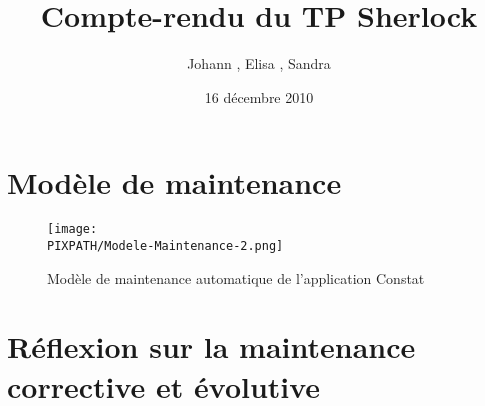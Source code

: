 \documentclass[a4paper]{article}
\title{\vfill \textbf{Compte-rendu du TP Sherlock}}
\author{Johann \bsc{Chazelle}, Elisa \bsc{Abidh}, Sandra \bsc{Mondain}}
\date{16 décembre 2010\vfill}
\newcommand\PIXPATH{../ressources}
\begin{document}
\maketitle

\newpage

\section{Modèle de maintenance}
\begin{figure}[!h]
\begin{center}
        \texttt{[image: \\PIXPATH/Modele-Maintenance-2.png]}
        \caption{Modèle de maintenance automatique de l'application Constat}
\end{center}
\end{figure}

\section{Réflexion sur la maintenance corrective et évolutive}
\end{document}
